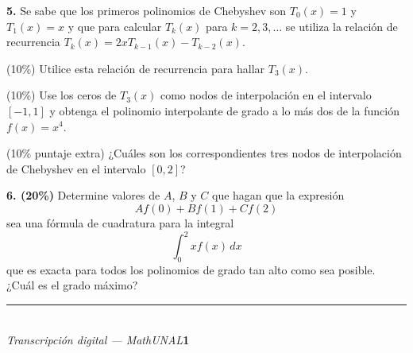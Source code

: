 \documentclass[11pt]{article}
\begin{document}
\vspace{5mm}
\noindent\textbf{5.} Se sabe que los primeros polinomios de Chebyshev son $T_0(x)=1$ y $T_1(x)=x$ y que para calcular $T_k(x)$ para $k=2,3,\ldots$ se utiliza la relación de recurrencia $T_k(x)=2xT_{k-1}(x)-T_{k-2}(x)$.
\begin{opciones}
\item (10\%) Utilice esta relación de recurrencia para hallar $T_3(x)$.
\item (10\%) Use los ceros de $T_3(x)$ como nodos de interpolación en el intervalo $[-1,1]$ y obtenga el polinomio interpolante de grado a lo más dos de la función $f(x)=x^4$.
\item (10\% puntaje extra) ¿Cuáles son los correspondientes tres nodos de interpolación de Chebyshev en el intervalo $[0,2]$?
\end{opciones}

\vspace{5mm}
\noindent\textbf{6. (20\%)} Determine valores de $A$, $B$ y $C$ que hagan que la expresión
\[
Af(0)+Bf(1)+Cf(2)
\]
sea una fórmula de cuadratura para la integral
\[
\int_0^2 xf(x)\,dx
\]
que es exacta para todos los polinomios de grado tan alto como sea posible. ¿Cuál es el grado máximo?

\vfill
\rule{\linewidth}{0.4pt}\\[1pt]
{\scriptsize\textit{Transcripción digital --- MathUNAL}\hfill\textcolor{unalblue}{\textbf{1}}}
\end{document}
